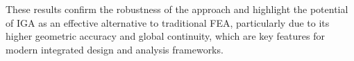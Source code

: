\documentclass[11pt]{book}
\newcommand{\clearemptydoublepage}{\newpage{\pagestyle{empty}\cleardoublepage}}
\theoremstyle{plain} %
\theoremstyle{definition} %
\theoremstyle{definition} %
\begin{document}
These results confirm the robustness of the approach and highlight the potential of IGA as an effective alternative to traditional FEA, particularly due to its higher geometric accuracy and global continuity, which are key features for modern integrated design and analysis frameworks.





\clearemptydoublepage
\end{document}

